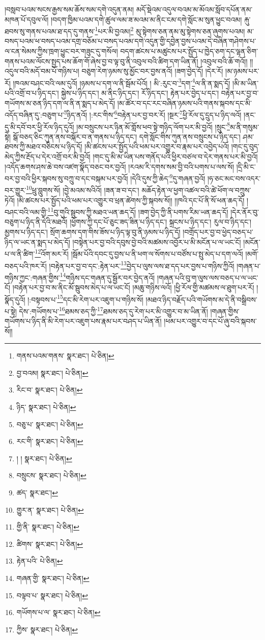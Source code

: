།བསླབ་པའམ་སངས་རྒྱས་སམ་ཆོས་སམ་དགེ་འདུན་ནམ། མདོ་སྡེའམ་འདུལ་བའམ་མ་མོའམ་སློབ་དཔོན་ནམ་མཁན་པོ་དབུལ་ལོ། །བདག་ཁྱིམ་པའམ་དགེ་ཚུལ་ལམ་ཟ་མའམ་མ་ནིང་ངམ་དགེ་སློང་མ་སུན་ཕྱུང་བའམ། རྐུ་ཐབས་སུ་གནས་པའམ་ཐ་དད་དུ་གནས་\footnote{གནས་པའམ་གནས་  སྣར་ཐང་།  པེ་ཅིན། }པར་མི་བྱའམ།\footnote{བྱ་བའམ།  སྣར་ཐང་།  པེ་ཅིན། } མུ་སྟེགས་ཅན་ནམ་མུ་སྟེགས་ཅན་ཞུགས་པའམ། མ་བསད་པའམ་ཕ་བསད་པའམ་དགྲ་བཅོམ་པ་བསད་པའམ་དགེ་འདུན་གྱི་དབྱེན་བྱས་པའམ་དེ་བཞིན་གཤེགས་པ་ལ་ངན་སེམས་ཀྱིས་ཁྲག་ཕྱུང་བར་གཟུང་དུ་གསོལ། བདག་ཚངས་པ་མཚུངས་པར་སྤྱོད་པ་ཁྱེད་ཅག་དང་ལྷན་ཅིག་གནས་པའམ་ལོངས་སྤྱད་པས་ཆོག་གོ་ཞེས་བྱ་བ་ལྟ་བུ་ནི་འབུལ་བའི་ཚིག་དག་ཡིན་ནོ། །འབུལ་བའི་ཆོ་གའོ།། །།འདུལ་བའི་མདོ་བམ་པོ་གཉིས་པ། བཅུག་རེག་ཉམས་སུ་མྱོང་བར་བྱས་ནའོ། །ཟག་བྱེད་དོ། །དེར་རོ། །མ་ཉམས་པར་རོ། །ཁའམ་བཤང་བའི་ལམ་དུའོ། །ཉམས་པ་དག་ལ་ནི་སྦོམ་པོའོ། །
མི་:རུང་བ་\footnote{རིང་བ་  སྣར་ཐང་།  པེ་ཅིན། }དག་\footnote{ཉིད་  སྣར་ཐང་།  པེ་ཅིན། }ལ་ནི་ན་སྨད་དོ། །མི་མ་ཡིན་པའི་འགྲོ་བ་པ་ཉིད་དང་། སྐྱེས་པ་ཉིད་དང་། མ་ནིང་ཉིད་དང་། རོ་ཉིད་དང་། རྟེན་པར་བྱེད་པ་དང་། བརྟེན་པར་བྱ་བ་གཡོགས་མ་ཅན་ཉིད་དག་ལ་ནི་ན་སྨད་པ་མེད་དོ། །མ་ཚོར་བ་དང་རང་བཞིན་ཉམས་པའི་གནས་སྐབས་དང་མི་འདོད་བཞིན་དུ་:བཅུག་པ་\footnote{བཅུ་པ་  སྣར་ཐང་།  པེ་ཅིན། }ཉིད་ནའོ། །:རང་གིས་\footnote{རང་གི་  སྣར་ཐང་།  པེ་ཅིན། }བརྟེན་པར་བྱ་བར་རོ། །སྔར་\footnote{། །  སྣར་ཐང་།  པེ་ཅིན། }ཕྱི་རོལ་དུ་དྲུད་པ་ཉིད་ལའོ། །ནང་དུ་མི་དབོ་བར་ཕྱི་རོལ་ཉིད་དུའོ། །མ་བསྲུངས་པར་ཉིན་མོ་གློས་ཕབ་སྟེ་གཉིད་ལོག་པར་མི་བྱའོ། །སྲུང་\footnote{བསྲུངས་  སྣར་ཐང་།  པེ་ཅིན། }མ་ནི་གསུམ་སྟེ། སྒོ་བཅད་ཅིང་ཀུན་ནས་བསྐོར་བ་ན་གནས་པ་ཉིད་དང་། དགེ་སློང་གིས་ཀུན་ནས་བསྲུངས་པ་ཉིད་དང་། ཤམ་ཐབས་ཀྱི་མཐའ་བཅིངས་པ་ཉིད་དོ། །མི་ཚངས་པར་སྤྱོད་པའི་ཕམ་པར་འགྱུར་བ་རྣམ་པར་འབྱེད་པའོ། །གང་དུ་བུད་མེད་ཀྱིས་རྔོད་པ་དེར་འགྲོ་བར་མི་བྱའོ། །གང་དུ་མི་མ་ཡིན་པས་གནོད་པའི་ཕྱིར་བཙལ་བ་དེར་གནས་པར་མི་བྱའོ། །འདོད་ཆགས་ཤས་ཆེ་བས་འཛག་སྣོད་བཅང་བར་བྱའོ། །རའམ་རི་དགས་སམ་བྱི་བའི་པགས་པ་ལས་སོ། །དྲི་མི་ང་བར་བྱ་བའི་ཕྱིར་སྐབས་སུ་བཀྲུ་བ་དང་བསྐམ་པར་བྱའོ། །དེའི་དུས་ཀྱི་ཆེད་\footnote{ཚད་  སྣར་ཐང་། }དུ་གཞན་བྱའོ། །ཧ་ཅང་མང་བས་འདར་བར་གྱུར་\footnote{གྱུར་ན་  སྣར་ཐང་།  པེ་ཅིན། }ཕྲུ་བླུགས་སོ། །བྱེ་མའམ་སའིའོ། །ཟན་ཟ་བ་དང་། མཆོད་རྟེན་ལ་ཕྱག་འཚལ་བའི་ཚེ་ཕོག་ལ་བཀྲུས་ཏེའོ། །མི་ཚངས་པར་སྤྱོད་པའི་ཕམ་པར་འགྱུར་བ་ཕྲན་ཚེགས་ཀྱི་སྐབས་སོ།། །།ཁའི་དང་པོ་ནི་སོ་ཕན་ཆད་དོ། །བཤང་བའི་ལམ་གྱི་\footnote{གྱི་ནི་  སྣར་ཐང་།  པེ་ཅིན། }བུ་གུའི་སྦུབས་ཀྱི་མཐའ་ཡན་ཆད་དོ། །ཟག་བྱེད་ཀྱི་ནི་པགས་རིམ་ཡན་ཆད་དོ། །དེར་ནོར་བུ་བཅུག་པ་ཉིད་ནི་དེའི་མཐའོ། །ཕྱོགས་ཀྱི་དང་པོ་ཅུང་ཟད་ཟིན་པ་ཉིད་དང་། སྐྲངས་པ་ཉིད་དང་། རུལ་བ་ཉིད་དང་། མྱགས་པ་ཉིད་དང་། སྲོག་ཆགས་དག་གིས་ཟོས་པ་ཉིད་ལྟ་བུ་ནི་ཉམས་པ་ཉིད་དོ། །བགྲོད་པར་བྱ་བ་ཕྱེད་བཅད་པ་ཉིད་ལ་ཡང་ན་སྨད་པ་མེད་དོ། །བསྟེན་པར་བྱ་བའི་དབུས་བྱེ་བའི་མཚམས་འབྱོར་པ་མི་མངོན་པ་ལ་ཡང་ངོ། །མངོན་པ་ལ་ནི་ཚིག་\footnote{ཚིགས་  སྣར་ཐང་།  པེ་ཅིན། }འོག་མར་རོ། །སྦོམ་པོའི་དབང་དུ་བྱས་པ་ནི་ཕག་ལ་སོགས་པ་བཙོས་པ་སྤུ་མེད་པ་དག་ལའོ། །མགོ་བཅད་པའི་ཁར་རོ། །བརྟེན་པར་བྱ་བ་དང་:རྟེན་པར་\footnote{རྟེན་པའི་  པེ་ཅིན། }བྱེད་པ་ལུས་ལས་ཐ་དད་པར་བྱས་པ་གཉིས་ཀྱིའོ། །གཞན་པ་གཉིས་ཀྱང་:གཞན་གྱིས་\footnote{གཞན་གྱི་  སྣར་ཐང་།  པེ་ཅིན། }གཉིས་དང་གཞན་དུ་སྦྱོར་བར་བྱེད་ནའོ། །གཞན་པའི་བུ་ག་ལུས་ལས་བཅད་པ་ལ་ཡང་ངོ། །བརྟེན་པར་བྱ་བ་མ་ནིང་མོ་སྦུབས་མེད་པ་ལ་ཡང་ངོ། །མཆུ་གཉིས་ལའོ། །ཕྱི་རོལ་གྱི་མཚམས་ལ་ཐུག་པར་རོ། །སྣོད་དུའོ། །:བསྟབས་པ་\footnote{བལྟབ་པ་  སྣར་ཐང་།  པེ་ཅིན། }དང་མི་རེག་པར་འཇུག་པ་གཉིས་སོ། །མཐའ་ཉིད་བརྗོད་པའི་གཡོགས་མ་དེ་ནི་བསྒྲིབས་པ་སྟེ། དེས་:གཡོགས་པ་\footnote{གཡོགས་པ་ལ་  སྣར་ཐང་།  པེ་ཅིན། }ཐམས་ཅད་ཀྱི་\footnote{ཀྱིས་  སྣར་ཐང་།  པེ་ཅིན། }ཐམས་ཅད་དུ་རེག་པར་མི་འགྱུར་བ་མ་ཡིན་ནོ། །གཞན་གྱིས་གཡོགས་པ་ཉིད་ནི་མི་རེག་པར་འཇུག་པས་རྣམ་པར་བཤད་པ་ཡིན་ནོ། །ཕམ་པར་འགྱུར་བ་དང་པོ་ཞུ་བའི་སྐབས་སོ།། 